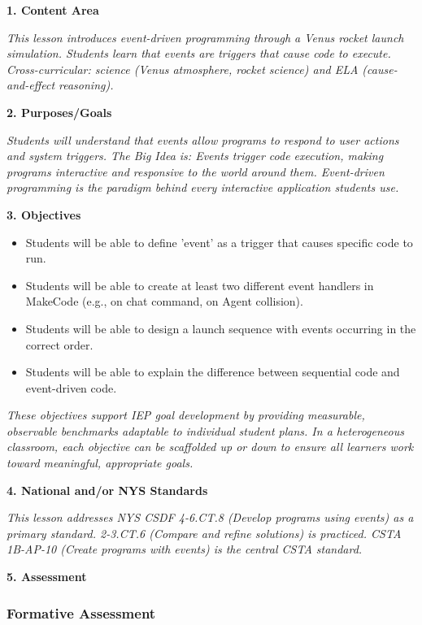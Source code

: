 \documentclass[11pt,letterpaper]{article}
\begin{document}
\textbf{1. Content Area}

\textit{This lesson introduces event-driven programming through a Venus rocket launch simulation. Students learn that events are triggers that cause code to execute. Cross-curricular: science (Venus atmosphere, rocket science) and ELA (cause-and-effect reasoning).}

\textbf{2. Purposes/Goals}

\textit{Students will understand that events allow programs to respond to user actions and system triggers. The Big Idea is: Events trigger code execution, making programs interactive and responsive to the world around them. Event-driven programming is the paradigm behind every interactive application students use.}

\textbf{3. Objectives}

\begin{itemize}
  \item Students will be able to define 'event' as a trigger that causes specific code to run.

  \item Students will be able to create at least two different event handlers in MakeCode (e.g., on chat command, on Agent collision).

  \item Students will be able to design a launch sequence with events occurring in the correct order.

  \item Students will be able to explain the difference between sequential code and event-driven code.
\end{itemize}

\textit{These objectives support IEP goal development by providing measurable, observable benchmarks adaptable to individual student plans. In a heterogeneous classroom, each objective can be scaffolded up or down to ensure all learners work toward meaningful, appropriate goals.}

\textbf{4. National and/or NYS Standards}

\textit{This lesson addresses NYS CSDF 4-6.CT.8 (Develop programs using events) as a primary standard. 2-3.CT.6 (Compare and refine solutions) is practiced. CSTA 1B-AP-10 (Create programs with events) is the central CSTA standard.}

\newpage
\textbf{5. Assessment}

\subsubsection{Formative Assessment}
\end{document}
